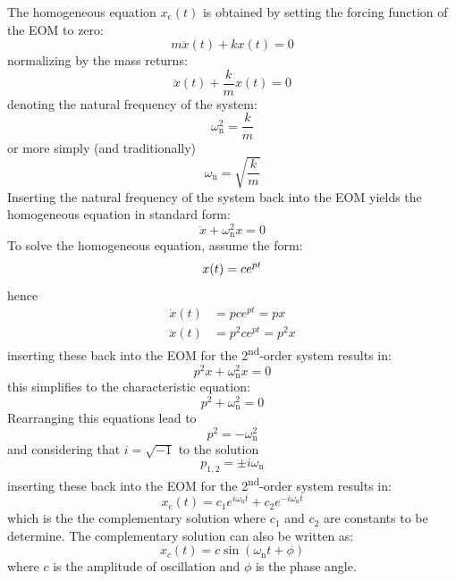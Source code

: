 \documentclass[12pt,letter]{article}
\numberwithin{ex}{section} %
\numberwithin{re}{section} %
\numberwithin{equation}{section}	%
\begin{document}
The homogeneous equation $x_\text{c}(t)$ is obtained by setting the forcing function of the EOM to zero:
\begin{equation}
m \ddot{x}(t) + kx(t) = 0
\end{equation}
normalizing by the mass returns:
\begin{equation}
\ddot{x}(t) + \frac{k}{m}x(t) = 0
\end{equation}
denoting the natural frequency of the system:
\begin{equation}
\omega_\text{n}^2 = \frac{k}{m}
\end{equation}
or more simply (and traditionally)
\begin{equation}
\omega_\text{n} = \sqrt{\frac{k}{m}}
\end{equation}
Inserting the natural frequency of the system back into the EOM yields the homogeneous equation in standard form:
\begin{equation}
\ddot{x} + \omega_\text{n}^2 x = 0
\end{equation}
To solve the homogeneous equation, assume the form:
\begin{equation}
x\text(t) = c e^{ p t} 
\end{equation}
hence
\begin{align}
\dot{x}(t)&= p c e^{ p t}  = px\\
\ddot{x}(t)&= p^2 c e^{ p t} = p^2x \nonumber
\end{align}
inserting these back into the EOM for the 2\textsuperscript{nd}-order system results in:
\begin{equation}
 p^2x + \omega_\text{n}^2 x = 0
\end{equation}
this simplifies to the characteristic equation:
\begin{equation}
 p^2 + \omega_\text{n}^2 = 0
\end{equation}
Rearranging this equations lead to
\begin{equation}
 p^2  = -\omega_\text{n}^2
\end{equation}
and considering that $i=\sqrt{-1}$ to the solution
\begin{equation}
p_{1,2}  = \pm i \omega_\text{n}
\end{equation}
inserting these back into the EOM for the 2\textsuperscript{nd}-order system results in:
\begin{equation}
x_\text{c}(t) = c_1 e ^{i \omega_\text{n} t} + c_2 e ^{-i \omega_\text{n} t} 
\end{equation}
which is the the complementary solution where $c_1$ and $c_2$ are constants to be determine.  The complementary solution can also be written as:
\begin{equation}
x_c(t) = c \sin(\omega_\text{n} t + \phi) 
\end{equation}
where $c$ is the amplitude of oscillation and $\phi$ is the phase angle. 
\end{document}
